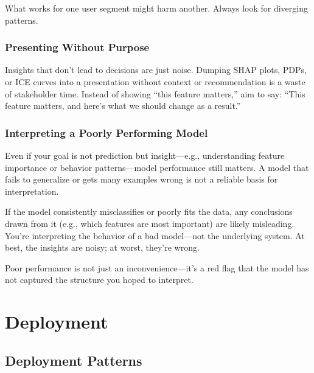 \documentclass[12pt,openany, draft]{book}
\begin{document}
\begin{notebox}
What works for one user segment might harm another. Always look for diverging patterns.
\end{notebox}



\section{Presenting Without Purpose}

Insights that don’t lead to decisions are just noise. Dumping SHAP plots, PDPs, or ICE curves into a presentation without context or recommendation is a waste of stakeholder time. Instead of showing “this feature matters,” aim to say: “This feature matters, and here’s what we should change as a result.”



\section{Interpreting a Poorly Performing Model}

Even if your goal is not prediction but insight—e.g., understanding feature importance or behavior patterns—model performance still matters. A model that fails to generalize or gets many examples wrong is not a reliable basis for interpretation. \newline

If the model consistently misclassifies or poorly fits the data, any conclusions drawn from it (e.g., which features are most important) are likely misleading. You're interpreting the behavior of a bad model—not the underlying system. At best, the insights are noisy; at worst, they're wrong. \newline

Poor performance is not just an inconvenience—it’s a red flag that the model has not captured the structure you hoped to interpret.





\part{Deployment}




\chapter{Deployment Patterns}
\end{document}
